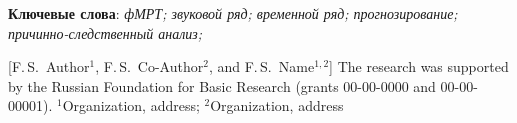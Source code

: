 \documentclass[12pt, twoside]{article}
\begin{document}
{\bigskip
\noindent
\textbf{Ключевые слова}: \emph {фМРТ; звуковой ряд; временной ряд; прогнозирование; причинно-следственный анализ;}
}

    [F.\,S.~Author$^1$, F.\,S.~Co-Author$^2$, and F.\,S.~Name$^{1, 2}$] %
\thanksEng
    {The research was
    	 supported by the Russian Foundation for Basic Research (grants 00-00-0000 and 00-00-00001).
    }
\organizationEng
    {$^1$Organization, address; $^2$Organization, address}
\abstractEng
\end{document}
